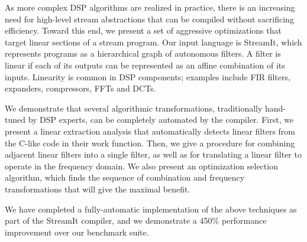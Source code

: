 As more complex DSP algorithms are realized in practice, there is an
increasing need for high-level stream abstractions that can be
compiled without sacrificing efficiency.  Toward this end, we present
a set of aggressive optimizations that target linear sections of a
stream program.  Our input language is StreamIt, which represents
programs as a hierarchical graph of autonomous filters.  A filter is
linear if each of its outputs can be represented as an affine
combination of its inputs.  Linearity is common in DSP components;
examples include FIR filters, expanders, compressors, FFTs and DCTs.

We demonstrate that several algorithmic transformations, traditionally
hand-tuned by DSP experts, can be completely automated by the
compiler.  First, we present a linear extraction analysis that
automatically detects linear filters from the C-like code in their
work function.  Then, we give a procedure for combining adjacent
linear filters into a single filter, as well as for translating a
linear filter to operate in the frequency domain.  We also present an
optimization selection algorithm, which finds the sequence of
combination and frequency transformations that will give the maximal
benefit.

We have completed a fully-automatic implementation of the above
techniques as part of the StreamIt compiler, and we demonstrate
a 450\% performance improvement over our benchmark suite.
